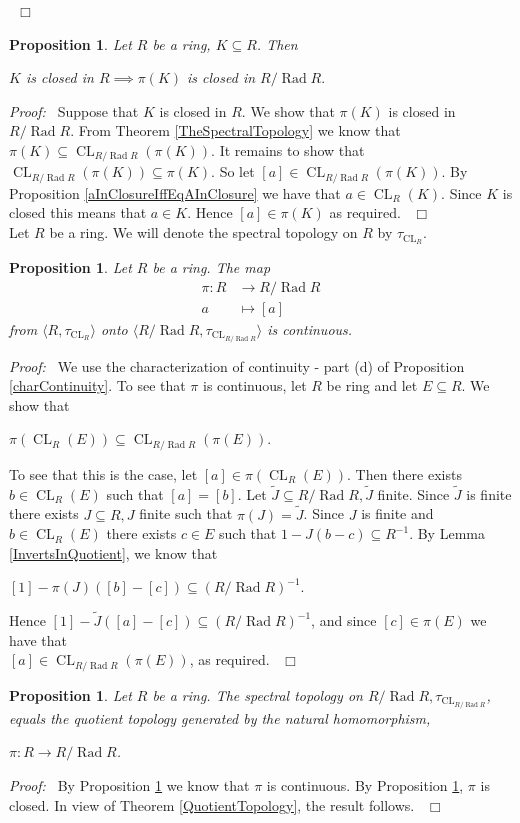 \documentclass[12pt, oneside]{book}
\newtheorem{proposition}[theorem]{Proposition}
\newcommand{\proof}{{\noindent \it Proof:~}}
\newcommand{\qed}{\hfill ~$\Box$\\}
\def\Rad{\operatorname{Rad}}
\def\CL{\operatorname{CL}}
\begin{document}
\qed
\begin{proposition}\label{KClosedIffPiKClosed}
\normalfont 
Let $R$ be a ring, $K \subseteq R$. Then 
\begin{center}
$K$ is closed in $R \implies \pi(K)$ is closed in $R / \Rad R.$
\end{center}
\end{proposition}
\proof \space
Suppose that $K$ is closed in $R$. We show that $\pi(K)$ is closed in $R/\Rad R$. From Theorem
\ref{TheSpectralTopology} we know that $\pi(K) \subseteq \CL_{R / \Rad R}(\pi(K))$. 
It remains to show that  $\CL_{R / \Rad R}(\pi(K)) \subseteq \pi(K)$. So let $[a] \in \CL_{R / \Rad R}(\pi(K))$. 
By Proposition \ref{aInClosureIffEqAInClosure} we have that $a \in \CL_R(K).$ Since $K$ is closed this means that $a \in K.$ Hence $[a] \in \pi(K)$ as required. \qed
\vskip 0.3cm
\noindent Let $R$ be a ring. We will denote the spectral topology on $R$ by $\tau_{\CL_R}$. 
\vskip 0.3cm
\begin{proposition} \label{PiIsContinuous}
\normalfont
Let $R$ be a ring. The map
\begin{align*}
\pi : R &\rightarrow R / \Rad R\\
a &\mapsto [a]
\end{align*}
from $\langle R, \tau_{\CL_R} \rangle$ onto $\langle R / \Rad R, \tau_{\CL_{R / \Rad R}} \rangle$ 
is continuous.
\end{proposition}
\proof \space
\noindent We use the characterization of continuity - part (d) of Proposition \ref{charContinuity}. To see that $\pi$ is continuous, let $R$ be  ring and let $E \subseteq R$.
We show that 
\begin{center}
$\pi(\CL_R(E)) \subseteq \CL_{R / \Rad R} (\pi(E))$.
\end{center}
To see that this is the case, let $[a] \in \pi(\CL_R(E)).$ Then there exists $b \in \CL_R(E)$ 
such that $[a] = [b]$. Let $\tilde{J} \subseteq R / \Rad R, \tilde{J}$ finite. Since $\tilde{J}$ 
is finite there exists $J \subseteq R, J$ finite such that $\pi(J) = \tilde{J}$. Since $J$ is finite
and $b \in \CL_R(E)$ there exists $c \in E$ such that $1 - J(b - c) \subseteq R^{-1}.$ 
By Lemma \ref{InvertsInQuotient}, we know that 
\begin{center}
$[1] - \pi(J)([b] - [c]) \subseteq (R/\Rad R)^{-1}$.
\end{center}
Hence $[1] - \tilde J([a] - [c]) \subseteq (R/\Rad R)^{-1}$, and since $[c] \in \pi(E)$ 
we have that \\
$[a] \in \CL_{R / \Rad R} (\pi(E))$, as required. \qed
\begin{proposition}
\normalfont
Let $R$ be a ring. The spectral topology on $R / \Rad R, \tau_{\CL_{R / \Rad R}}$, equals the quotient topology generated by the natural homomorphism, 
\begin{center}
$\pi : R \rightarrow R / \Rad R$.
\end{center}
\end{proposition} 
\proof \space
By Proposition \ref{PiIsContinuous} we know that $\pi$ is continuous. By Proposition \ref{KClosedIffPiKClosed}, $\pi$ is closed. In view of Theorem \ref{QuotientTopology}, 
the result follows.
\qed 
 
\end{document}
